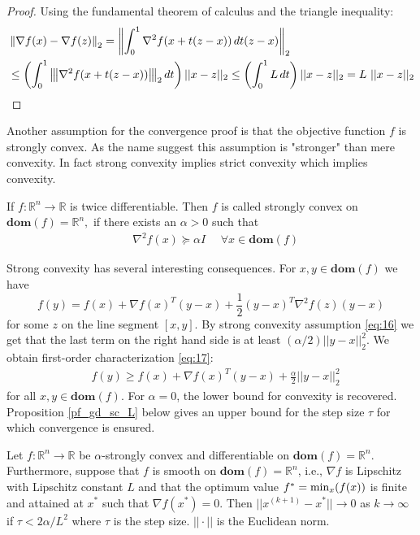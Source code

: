 \begin{proof}
Using the fundamental theorem of calculus and the triangle inequality:
\begin{align*}
&\left\Vert\nabla f(x) - \nabla f(z)\right\Vert_{2}
=\left\Vert\int_{0}^{1} \nabla^{2} f(x + t(z-x))\,dt(z-x)\right\Vert_{2}\\
&\leq \left(\int_{0}^{1} {\left\vert\kern-0.25ex\left\vert\kern-0.25ex\left\vert \nabla^{2} f(x + t(z-x)) \right\vert\kern-0.25ex\right\vert\kern-0.25ex\right\vert}_{2} \,dt\right) ||x-z||_{2} \leq \left(\int_{0}^{1} L \,dt\right) ||x-z||_{2} = L\text{ }||x-z||_{2}\qedhere
\end{align*}
\end{proof}
Another assumption for the convergence proof is that the objective function $f$ is strongly convex. As the name suggest this assumption is "stronger" than mere convexity. In fact strong convexity implies strict convexity which implies convexity. 
\begin{definition}
\cite[459]{boyd2004convex}
If $f:\mathbb{R}^{n}\longrightarrow\mathbb{R}$ is twice differentiable. Then $f$ is called strongly convex on $\textbf{dom}(f)=\mathbb{R}^{n},$ if there exists an $\alpha > 0$ such that
\begin{equation*}\label{eq:16}\tag{4.2.1.3}
\begin{aligned}
    &\nabla^{2} f(x) \succcurlyeq \alpha I \text{ } \text{ }\forall x \in \textbf{dom}(f)
\end{aligned}
\end{equation*}
\end{definition}
Strong convexity has several interesting consequences. For $x,y \in \textbf{dom}(f)$ we have
$$f(y) = f(x) + \nabla f(x)^{T}(y-x) + \frac{1}{2} (y-x)^{T}\nabla^{2} f(z) (y-x)$$
for some $z$ on the line segment $[x, y].$ By strong convexity assumption \eqref{eq:16} we get that the last term on the right hand side is at least $(\alpha/2)||y-x||^{2}_{2}.$ We obtain first-order characterization \eqref{eq:17}:
\begin{equation*}\label{eq:17}\tag{4.2.1.4}
\begin{aligned}
    &f(y) \geq f(x) + \nabla f(x)^{T}(y-x) + \frac{\alpha}{2}||y-x||^{2}_{2}
\end{aligned}
\end{equation*}
for all $x,y \in \textbf{dom}(f)$. For $\alpha=0$, the lower bound for convexity is recovered. Proposition \ref{pf_gd_sc_L} below gives an upper bound for the step size $\tau$ for which convergence is ensured.
\begin{proposition}\label{pf_gd_sc_L}
Let $f: \mathbb{R}^{n}\longrightarrow \mathbb{R}$ be $\alpha$-strongly convex and differentiable on $\textbf{dom}(f) = \mathbb{R}^{n}.$ Furthermore, suppose that $f$ is smooth on $\textbf{dom}(f)= \mathbb{R}^{n}$, i.e., $\nabla f$ is Lipschitz with Lipschitz constant $L$ and that the optimum value $f^{*} = \textnormal{min}_{x}(f(x))$ is finite and attained at $x^{*}$ such that $\nabla f(x^{*})=0.$ Then $||x^{(k+1)}-x^{*}|| \rightarrow 0$ as $k \rightarrow \infty$ if $\tau < 2\alpha/L^{2}$ where $\tau$ is the step size. $||\cdot||$ is the Euclidean norm. 
\end{proposition}
